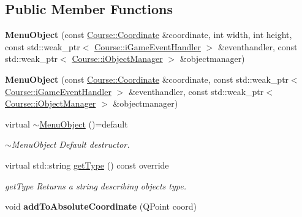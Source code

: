\subsection*{Public Member Functions}
\begin{DoxyCompactItemize}
\item 
\hypertarget{class_student_1_1_menu_object_afb2675e0b9c03d88fbc669225e42b201}{{\bfseries Menu\-Object} (const \hyperlink{class_course_1_1_coordinate}{Course\-::\-Coordinate} \&coordinate, int width, int height, const std\-::weak\-\_\-ptr$<$ \hyperlink{class_course_1_1i_game_event_handler}{Course\-::i\-Game\-Event\-Handler} $>$ \&eventhandler, const std\-::weak\-\_\-ptr$<$ \hyperlink{class_course_1_1i_object_manager}{Course\-::i\-Object\-Manager} $>$ \&objectmanager)}\label{class_student_1_1_menu_object_afb2675e0b9c03d88fbc669225e42b201}

\item 
\hypertarget{class_student_1_1_menu_object_a6815a6f2fd3d11b396681c2341f99e3b}{{\bfseries Menu\-Object} (const \hyperlink{class_course_1_1_coordinate}{Course\-::\-Coordinate} \&coordinate, const std\-::weak\-\_\-ptr$<$ \hyperlink{class_course_1_1i_game_event_handler}{Course\-::i\-Game\-Event\-Handler} $>$ \&eventhandler, const std\-::weak\-\_\-ptr$<$ \hyperlink{class_course_1_1i_object_manager}{Course\-::i\-Object\-Manager} $>$ \&objectmanager)}\label{class_student_1_1_menu_object_a6815a6f2fd3d11b396681c2341f99e3b}

\item 
\hypertarget{class_student_1_1_menu_object_aa0be876f52a06553324f950fa537722e}{virtual \hyperlink{class_student_1_1_menu_object_aa0be876f52a06553324f950fa537722e}{$\sim$\-Menu\-Object} ()=default}\label{class_student_1_1_menu_object_aa0be876f52a06553324f950fa537722e}

\begin{DoxyCompactList}\small\item\em $\sim$\-Menu\-Object Default destructor. \end{DoxyCompactList}\item 
virtual std\-::string \hyperlink{class_student_1_1_menu_object_ad014a4bd1e775c1be6689ffe018fed6b}{get\-Type} () const override
\begin{DoxyCompactList}\small\item\em get\-Type Returns a string describing objects type. \end{DoxyCompactList}\item 
\hypertarget{class_student_1_1_menu_object_a477f6cc25dab07a9e2fac876ac62f4f4}{void {\bfseries add\-To\-Absolute\-Coordinate} (Q\-Point coord)}\label{class_student_1_1_menu_object_a477f6cc25dab07a9e2fac876ac62f4f4}


\end{DoxyCompactItemize}
